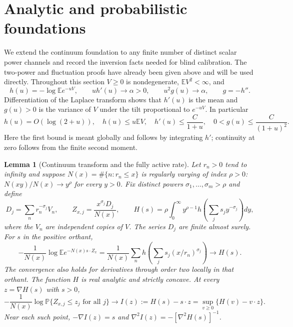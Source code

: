 \documentclass[11pt,letterpaper]{article}
\newtheorem{lemma}[theorem]{Lemma}
\theoremstyle{definition}
\theoremstyle{remark}
\newcommand{\1}{\mathbf 1}
\begin{document}
\section{Analytic and probabilistic foundations}
\label{p06:sec:scalar-foundation}

We extend the continuum foundation to any finite number of distinct
scalar power channels and record the inversion facts needed for blind
calibration. The two-power and fluctuation proofs have already been
given above and will be used directly.
Throughout this section $V\ge0$ is nondegenerate,
$\mathbb EV^2<\infty$, and
\begin{equation}\label{p06:eq:scalar-foundation-hypotheses}
 h(u)=-\log\mathbb E e^{-uV},\qquad
 uh'(u)\longrightarrow\alpha>0,\qquad
 u^2g(u)\longrightarrow\alpha,\qquad g=-h''.
\end{equation}
Differentiation of the Laplace transform shows that $h'(u)$ is the
mean and $g(u)>0$ is the variance of $V$ under the tilt proportional
to $e^{-uV}$.  In particular
\begin{equation}\label{p06:eq:scalar-foundation-bounds}
 h(u)=O(\log(2+u)),\quad h(u)\le u\mathbb EV,\quad
 h'(u)\le\frac{C}{1+u},\quad
 0<g(u)\le\frac{C}{(1+u)^2}.
\end{equation}
Here the first bound is meant globally and follows by integrating
$h'$; continuity at zero follows from the finite second moment.

\begin{lemma}[Continuum transform and the fully active rate]
\label{p06:lem:scalar-continuum-foundation}
Let $r_n>0$ tend to infinity and suppose
$N(x)=\#\{n:r_n\le x\}$ is regularly varying of index $\rho>0$:
$N(xy)/N(x)\to y^\rho$ for every $y>0$.
Fix distinct powers $\sigma_1,\ldots,\sigma_m>\rho$ and define
\[
 D_j=\sum_n r_n^{-\sigma_j}V_n,\qquad
 Z_{x,j}=\frac{x^{\sigma_j}D_j}{N(x)},\qquad
 H(s)=\rho\int_0^\infty y^{\rho-1}
 h\left(\sum_j s_jy^{-\sigma_j}\right)dy,
\]
where the $V_n$ are independent copies of $V$.  The series $D_j$
are finite almost surely.  For $s$ in the positive orthant,
\[
 -\frac1{N(x)}\log\mathbb E e^{-N(x)s\cdot Z_x}
 =\frac1{N(x)}\sum_nh\left(\sum_j s_j(x/r_n)^{\sigma_j}\right)
 \longrightarrow H(s).
\]
The convergence also holds for derivatives through order two locally
in that orthant.  The function $H$ is real analytic and strictly
concave.  At every $z=\nabla H(s)$ with $s>0$,
\begin{equation}\label{p06:eq:scalar-active-ldp}
 -\frac1{N(x)}\log\mathbb P\{Z_{x,j}\le z_j\text{ for all }j\}
 \longrightarrow I(z):=H(s)-s\cdot z
 =\sup_{v\ge0}\{H(v)-v\cdot z\}.
\end{equation}
Near each such point,
$-\nabla I(z)=s$ and $\nabla^2I(z)=-[\nabla^2H(s)]^{-1}$.
\end{lemma}
\end{document}
